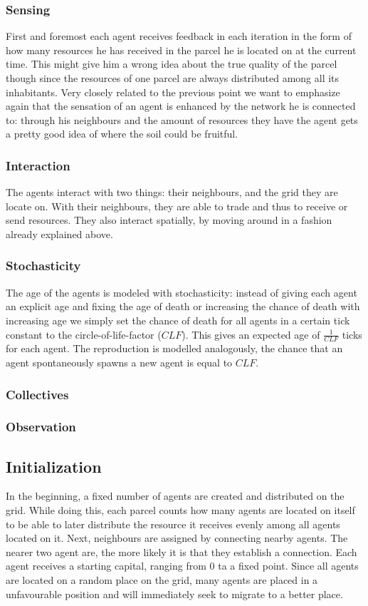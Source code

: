 \documentclass{JASSS}
\newcommand{\clf}{\mathit{CLF}}
\begin{document}
\subsubsection{Sensing}
	First and foremost each agent receives feedback in each iteration in the form of how many resources he has received in the parcel he is located on at the current time. This might give him a wrong idea about the true quality of the parcel though since the resources of one parcel are always distributed among all its inhabitants. Very closely related to the previous point we want to emphasize again that the sensation of an agent is enhanced by the network he is connected to: through his neighbours and the amount of resources they have the agent gets a pretty good idea of where the soil could be fruitful.

\subsubsection{Interaction}
	The agents interact with two things: their neighbours, and the grid they are locate on. With their neighbours, they are able to trade and thus to receive or send resources. They also interact spatially, by moving around in a fashion already explained above.

\subsubsection{Stochasticity}
	The age of the agents is modeled with stochasticity: instead of giving each agent an explicit age and fixing the age of death or increasing the chance of death with increasing age we simply set the chance of death for all agents in a certain tick constant to the circle-of-life-factor ($\clf$). This gives an expected age of $\frac{1}{\clf}$ ticks for each agent. The reproduction is modelled analogously, the chance that an agent spontaneously spawns a new agent is equal to $\clf$.

\subsubsection{Collectives}
\subsubsection{Observation}

\subsection{Initialization}
	In the beginning, a fixed number of agents are created and distributed on the grid. While doing this, each parcel counts how many agents are located on itself to be able to later distribute the resource it receives evenly among all agents located on it. Next, neighbours are assigned by connecting nearby agents. The nearer two agent are, the more likely it is that they establish a connection. Each agent receives a starting capital, ranging from 0 ta a fixed point. Since all agents are located on a random place on the grid, many agents are placed in a unfavourable position and will immediately seek to migrate to a better place.
	
\end{document}
